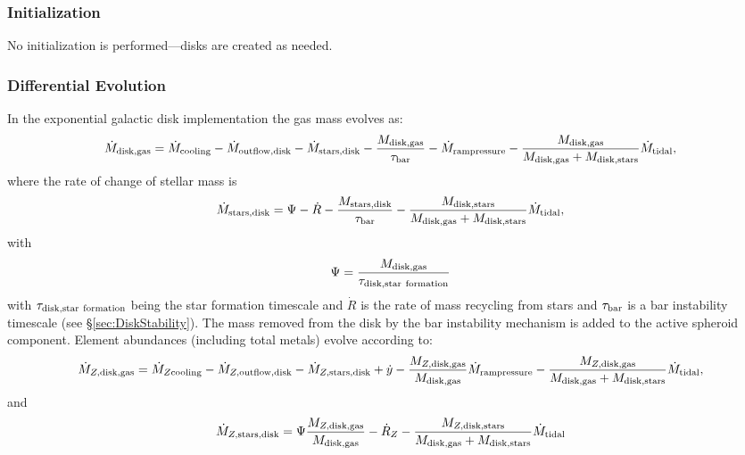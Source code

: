 \subsubsection{Initialization}

No initialization is performed---disks are created as needed.

\subsubsection{Differential Evolution}

In the exponential galactic disk implementation the gas mass evolves as:
\begin{equation}
 \dot{M}_{\rm disk, gas} = \dot{M}_{\rm cooling} - \dot{M}_{\rm outflow, disk} - \dot{M}_{\rm stars, disk} - {M_{\rm disk, gas}\over \tau_{\rm bar}} - \dot{M}_{\rm ram pressure} - {M_{\rm disk, gas} \over M_{\rm disk, gas} + M_{\rm disk, stars}} \dot{M}_{\rm tidal},
\end{equation}
where the rate of change of stellar mass is
\begin{equation}
 \dot{M}_{\rm stars, disk} = \Psi - \dot{R} - {M_{\rm stars,disk} \over \tau_{\rm bar}} - {M_{\rm disk, stars} \over M_{\rm disk, gas} + M_{\rm disk, stars}} \dot{M}_{\rm tidal},
\end{equation}
with
\begin{equation}
 \Psi = {M_{\rm disk, gas} \over \tau_{\rm disk, star~formation}}
\end{equation}
with $\tau_{\rm disk, star~formation}$ being the star formation timescale and $\dot{R}$ is the rate of mass recycling from stars and $\tau_{\rm bar}$ is a bar instability timescale (see \S\ref{sec:DiskStability}). The mass removed from the disk by the bar instability mechanism is added to the active spheroid component.
Element abundances (including total metals) evolve according to:
\begin{equation}
  \dot{M}_{Z, {\rm disk, gas}} = \dot{M}_{Z {\rm cooling}} - \dot{M}_{Z, {\rm outflow, disk}} - \dot{M}_{Z, {\rm stars, disk}} + \dot{y} - {M_{Z, {\rm disk, gas}} \over M_{\rm disk, gas}} \dot{M}_{\rm ram pressure} - {M_{Z, {\rm disk, gas}} \over M_{\rm disk, gas} + M_{\rm disk, stars}} \dot{M}_{\rm tidal},
\end{equation}
and
\begin{equation}
 \dot{M}_{Z, {\rm stars, disk}} = \Psi {M_{Z, {\rm disk, gas}} \over M_{\rm disk, gas}} - \dot{R}_Z - {M_{Z, {\rm disk, stars}} \over M_{\rm disk, gas} + M_{\rm disk, stars}} \dot{M}_{\rm tidal}
\end{equation}
